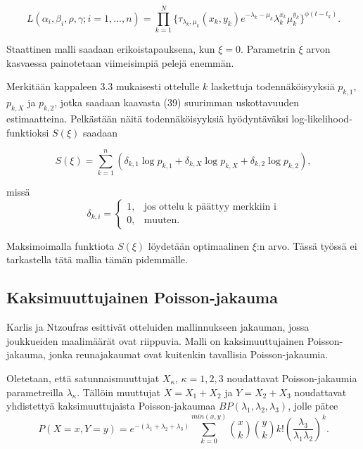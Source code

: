 \documentclass[a4paper,finnish,titlepage,12pt]{article}
\begin{document}
\begin{equation}
	L(\alpha_i, \beta_i, \rho, \gamma; i=1,...,n) = \prod_{k=1}^{N} \{\tau_{\lambda_k, \mu_k} (x_k, y_k) e^{-\lambda_k - \mu_k} \lambda_k^{x_k} 		\mu_k^{y_k}\}^{\phi(t - t_k)}.
\end{equation}

Staattinen malli saadaan erikoistapauksena, kun $\xi = 0$. Parametrin $\xi$ arvon kasvaessa painotetaan viimeisimpiä pelejä enemmän.

Merkitään kappaleen 3.3 mukaisesti ottelulle $k$ laskettuja todennäköisyyksiä $p_{k,1}$, $p_{k,X}$ ja $p_{k,2}$, jotka saadaan kaavasta (39) suurimman uskottavuuden estimaatteina. Pelkästään näitä todennäköisyyksiä hyödyntäväksi log-likelihood-funktioksi $S(\xi)$ saadaan

\begin{equation}
S(\xi) = \sum_{k=1}^{n} (\delta_{k,1} \log p_{k,1} + \delta_{k,X} \log p_{k,X} + \delta_{k,2} \log p_{k,2}),
\end{equation}

missä 
\begin{equation}
	\delta_{k,i} = 
	\begin{cases}
		1, & \text{jos ottelu k päättyy merkkiin i} \\
		0, & \text{muuten}.
	\end{cases}
\end{equation}

Maksimoimalla funktiota $S(\xi)$ löydetään optimaalinen $\xi$:n arvo.
Tässä työssä ei tarkastella tätä mallia tämän pidemmälle.



\subsection{Kaksimuuttujainen Poisson-jakauma}
Karlis ja Ntzoufras \cite{bivariate} esittivät otteluiden mallinnukseen jakauman, jossa joukkueiden maalimäärät ovat riippuvia. Malli on kaksimuuttujainen Poisson-jakauma, jonka reunajakaumat ovat kuitenkin tavallisia Poisson-jakaumia.

Oletetaan, että satunnaismuuttujat $X_\kappa$, $\kappa = 1,2,3$ noudattavat Poisson-jakaumia parametreilla $\lambda_\kappa$. Tällöin muuttujat $X = X_1 + X_2$ ja $Y = X_2 + X_3$ noudattavat yhdistettyä kaksimuuttujaista Poisson-jakaumaa $BP(\lambda_1, \lambda_2, \lambda_3)$, jolle pätee
\begin{equation}
	P(X=x, Y=y) = e^{-(\lambda_1 + \lambda_2 + \lambda_3)} \sum_{k=0}^{min(x,y)} \binom{x}{k} \binom{y}{k} k! (\frac{\lambda_3}{\lambda_1 \lambda_2})^k.
\end{equation}
\end{document}
